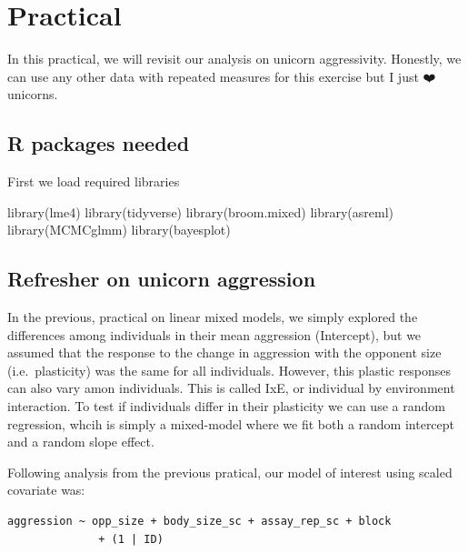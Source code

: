 \documentclass[
  12pt,
]{book}
\newenvironment{Shaded}{\begin{snugshade}}{\end{snugshade}}
\newcommand{\FunctionTok}[1]{\textcolor[rgb]{0.00,0.00,0.00}{#1}}
\newcommand{\NormalTok}[1]{#1}
\begin{document}
\hypertarget{practical-6}{%
\section{Practical}\label{practical-6}}

In this practical, we will revisit our analysis on unicorn aggressivity.
Honestly, we can use any other data with repeated measures for this exercise
but I just ❤️ unicorns.

\hypertarget{r-packages-needed-3}{%
\subsection{R packages needed}\label{r-packages-needed-3}}

First we load required libraries

\begin{Shaded}
\begin{Highlighting}[]
\FunctionTok{library}\NormalTok{(lme4)}
\FunctionTok{library}\NormalTok{(tidyverse)}
\FunctionTok{library}\NormalTok{(broom.mixed)}
\FunctionTok{library}\NormalTok{(asreml)}
\FunctionTok{library}\NormalTok{(MCMCglmm)}
\FunctionTok{library}\NormalTok{(bayesplot)}
\end{Highlighting}
\end{Shaded}

\hypertarget{refresher-on-unicorn-aggression}{%
\subsection{Refresher on unicorn aggression}\label{refresher-on-unicorn-aggression}}

In the previous, practical on linear mixed models, we simply explored the differences among individuals in their mean aggression (Intercept), but we assumed that the response to the change in aggression with the opponent size (i.e.~plasticity) was the same for all individuals. However, this plastic responses can also vary amon individuals. This is called IxE, or individual by environment interaction. To test if individuals differ in their plasticity we can use a random regression, whcih is simply a mixed-model where we fit both a random intercept and a random slope effect.

Following analysis from the previous pratical, our model of interest using scaled covariate was:

\begin{verbatim}
aggression ~ opp_size + body_size_sc + assay_rep_sc + block
              + (1 | ID)
\end{verbatim}
\end{document}

